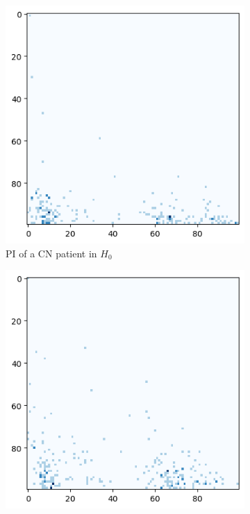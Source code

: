 \documentclass{article}
\begin{document}
\begin{figure}
  \centering
  \begin{subfigure}{0.32\textwidth}
    \includegraphics[width=\textwidth]{figures/PIs/Persistence_image_CN_h_0.png}
    \caption{PI of a CN patient in $H_0$}
  \end{subfigure}
  \begin{subfigure}{0.32\textwidth}
    \includegraphics[width=\textwidth]{figures/PIs/Persistence_image_MCI_h_0.png}

\end{subfigure}
\end{figure}
\end{document}
